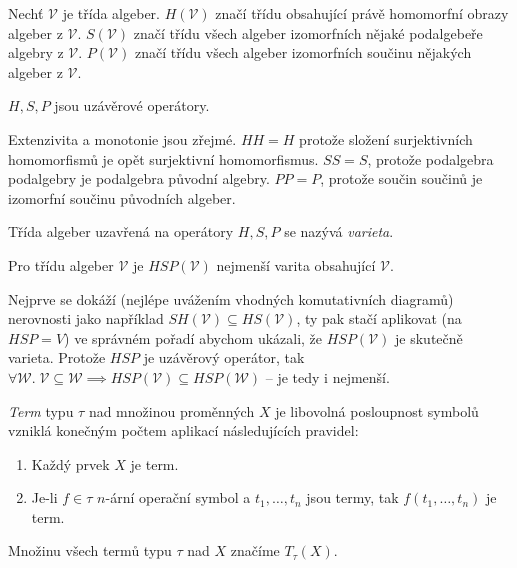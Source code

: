 \begin{definition}[H, S, P]
    Nechť $\mathcal{V}$ je třída algeber.
    $H(\mathcal{V})$ značí třídu obsahující právě homomorfní obrazy
    algeber z $\mathcal{V}$.
    $S(\mathcal{V})$ značí třídu všech algeber izomorfních nějaké podalgebeře
    algebry z $\mathcal{V}$.
    $P(\mathcal{V})$ značí třídu všech algeber izomorfních součinu
    nějakých algeber z $\mathcal{V}$.
\end{definition}

\begin{claim}
$H,S,P$ jsou uzávěrové operátory.
\end{claim}

Extenzivita a monotonie jsou zřejmé. $HH = H$ protože složení
surjektivních homomorfismů je opět surjektivní homomorfismus.
$SS = S$, protože podalgebra podalgebry je podalgebra původní algebry.
$PP = P$, protože součin součinů je izomorfní součinu původních algeber.

\begin{definition}
    Třída algeber uzavřená na operátory $H, S, P$ se nazývá
    {\em varieta}.
\end{definition}

\begin{theorem}
    Pro třídu algeber $\mathcal{V}$ je
    $HSP(\mathcal{V})$ nejmenší varita obsahující $\mathcal{V}$.
\end{theorem}

Nejprve se dokáží (nejlépe uvážením vhodných komutativních diagramů)
nerovnosti jako například
$SH(\mathcal{V}) \subseteq HS(\mathcal{V})$,
ty pak stačí aplikovat (na $HSP = V$) ve správném pořadí abychom ukázali, že
$HSP(\mathcal{V})$ je skutečně varieta. Protože $HSP$ je uzávěrový
operátor, tak
$\forall \mathcal{W}. \; \mathcal{V} \subseteq \mathcal{W} \implies
HSP(\mathcal{V}) \subseteq HSP(\mathcal{W})$ -- je tedy i nejmenší.

\begin{definition}[Term]
{\em Term} typu $\tau$ nad množinou proměnných $X$ je libovolná
posloupnost symbolů vzniklá konečným počtem aplikací následujících
pravidel:
\begin{enumerate}
    \item Každý prvek $X$ je term.
    \item Je-li $f \in \tau$ $n$-ární operační symbol a $t_1, \ldots, t_n$
        jsou termy, tak $f(t_1, \ldots, t_n)$ je term.
\end{enumerate}
\noindent
Množinu všech termů typu $\tau$ nad $X$ značíme $T_\tau(X)$.
\end{definition}

